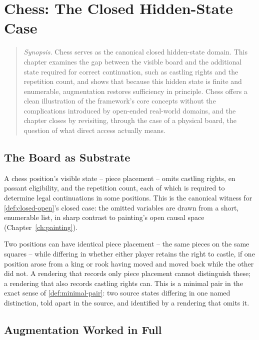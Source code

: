 \chapter{Chess: The Closed Hidden-State Case}
\label{ch:chess}

\begin{quotation}
\noindent\textit{Synopsis.} Chess serves as the canonical closed
hidden-state domain. This chapter examines the gap between the visible
board and the additional state required for correct continuation, such as
castling rights and the repetition count, and shows that because this
hidden state is finite and enumerable, augmentation restores sufficiency in
principle. Chess offers a clean illustration of the framework's core
concepts without the complications introduced by open-ended real-world
domains, and the chapter closes by revisiting, through the case of a
physical board, the question of what direct access actually means.
\end{quotation}

\section{The Board as Substrate}

A chess position's visible state -- piece placement -- omits castling
rights, en passant eligibility, and the repetition count, each of which
is required to determine legal continuations in some positions. This is
the canonical witness for \cref{def:closed-open}'s closed case: the
omitted variables are drawn from a short, enumerable list, in sharp
contrast to painting's open causal space (Chapter~\ref{ch:painting}).

\begin{example}
\label{ex:castling-position}
Two positions can have identical piece placement -- the same pieces on
the same squares -- while differing in whether either player retains the
right to castle, if one position arose from a king or rook having moved
and moved back while the other did not. A rendering that records only
piece placement cannot distinguish these; a rendering that also records
castling rights can. This is a minimal pair in the exact sense of
\cref{def:minimal-pair}: two source states differing in one named
distinction, told apart in the source, and identified by a rendering
that omits it.
\end{example}

\section{Augmentation Worked in Full}

